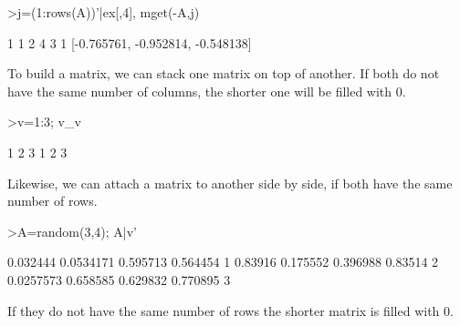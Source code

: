 \documentclass{article}
\begin{document}
\begin{eulernotebook}
\begin{eulercomment}
\begin{eulercomment}
\begin{eulercomment}
\begin{eulercomment}
\begin{eulercomment}
\end{eulercomment}
\begin{eulerprompt}
>j=(1:rows(A))'|ex[,4], mget(-A,j)
\end{eulerprompt}
\begin{euleroutput}
              1             1 
              2             4 
              3             1 
  [-0.765761,  -0.952814,  -0.548138]
\end{euleroutput}
\begin{eulercomment}
\begin{eulercomment}
\begin{eulercomment}
To build a matrix, we can stack one matrix on top of another. If both
do not have the same number of columns, the shorter one will be filled
with 0.
\end{eulercomment}
\begin{eulerprompt}
>v=1:3; v_v
\end{eulerprompt}
\begin{euleroutput}
              1             2             3 
              1             2             3 
\end{euleroutput}
\begin{eulercomment}
Likewise, we can attach a matrix to another side by side, if both have
the same number of rows.
\end{eulercomment}
\begin{eulerprompt}
>A=random(3,4); A|v'
\end{eulerprompt}
\begin{euleroutput}
       0.032444     0.0534171      0.595713      0.564454             1 
        0.83916      0.175552      0.396988       0.83514             2 
      0.0257573      0.658585      0.629832      0.770895             3 
\end{euleroutput}
\begin{eulercomment}
If they do not have the same number of rows the shorter matrix is
filled with 0.


\end{eulercomment}
\end{eulercomment}
\end{eulercomment}
\end{eulercomment}
\end{eulercomment}
\end{eulercomment}
\end{eulercomment}
\end{eulernotebook}
\end{document}
